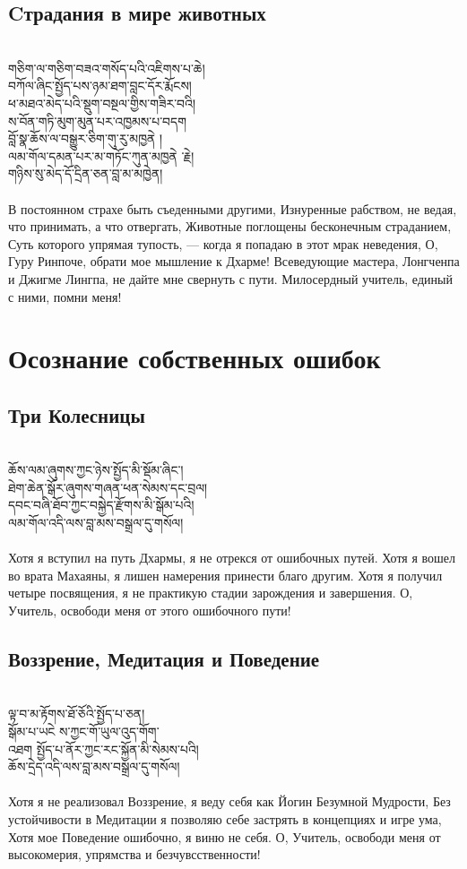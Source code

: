 \subsection*{Cтрадания в мире животных}
\\
\ti
གཅིག་ལ་གཅིག་བཟའ་གསོད་པའི་འཇིགས་པ་ཆེ།\\
བཀོལ་ཞིང་སྤྱོད་པས་ཉམ་ཐག་བླང་དོར་རྨོངས། \\
ཕ་མཐའ་མེད་པའི་སྡུག་བསྔལ་གྱིས་གཟིར་བའི། \\
ས་བོན་གཏི་མུག་མུན་པར་འཁྱམས་པ་བདག \\
བློ་སྣ་ཆོས་ལ་བསྒྱུར་ཅིག་གུ་རུ་མཁྱནེ ། \\
ལམ་གོལ་དམན་པར་མ་གཏོང་ཀུན་མཁྱནེ ་རྗེ། \\
གཉིས་སུ་མེད་དོ་དྲིན་ཅན་བླ་མ་མཁྱེན།\\
\\
\ru
В постоянном страхе быть съеденными другими,
Изнуренные рабством, не ведая, что принимать, а что отвергать,
Животные поглощены бесконечным страданием,
Суть которого упрямая тупость, — когда я попадаю в этот мрак неведения,
О, Гуру Ринпоче, обрати мое мышление к Дхарме!
Всеведующие мастера, Лонгченпа и Джигме Лингпа, не дайте мне свернуть с пути. Милосердный учитель, единый с ними, помни меня!

\section*{Осознание собственных ошибок}
\subsection*{Три Колесницы}
\\
\ti
ཆོས་ལམ་ཞུགས་ཀྱང་ཉེས་སྤྱོད་མི་སྡོམ་ཞིང་།\\
ཐེག་ཆེན་སྒོར་ཞུགས་གཞན་ཕན་སེམས་དང་བྲལ།\\
དབང་བཞི་ཐོབ་ཀྱང་བསྐྱེད་རྫོགས་མི་སྒོམ་པའི།\\
ལམ་གོལ་འདི་ལས་བླ་མས་བསྒྲལ་དུ་གསོལ།\\
\\
\ru
Хотя я вступил на путь Дхармы, я не отрекся от ошибочных путей.
Хотя я вошел во врата Махаяны, я лишен намерения принести благо другим.
Хотя я получил четыре посвящения, я не практикую стадии зарождения и завершения. О, Учитель, освободи меня от этого ошибочного пути!

\subsection*{Воззрение, Медитация и Поведение}
\\
\ti
ལྟ་བ་མ་རྟོགས་ཐོ་ཅོའི་སྤྱོད་པ་ཅན།\\
སྒོམ་པ་ཡངེ ས་ཀྱང་གོ་ཡུལ་འུད་གོག་\\
འཐག སྤྱོད་པ་ནོར་ཀྱང་རང་སྐྱོན་མི་སེམས་པའི། \\
ཆོས་དྲེད་འདི་ལས་བླ་མས་བསྒྲལ་དུ་གསོལ།\\
\\
\ru
Хотя я не реализовал Воззрение, я веду себя как Йогин Безумной Мудрости,
Без устойчивости в Медитации я позволяю себе застрять в концепциях и игре ума, Хотя мое Поведение ошибочно, я виню не себя.
О, Учитель, освободи меня от высокомерия, упрямства и безчувсственности!

